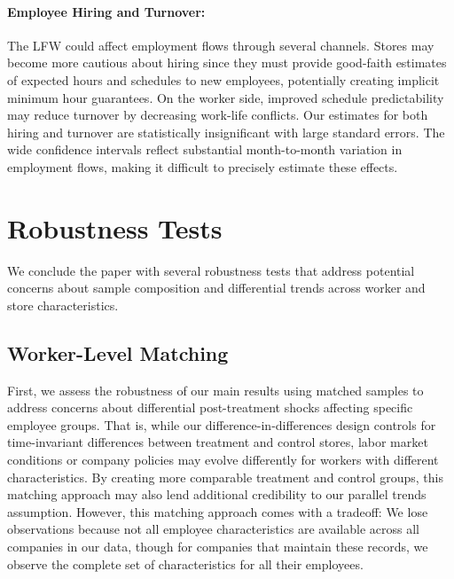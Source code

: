 \documentclass[letterpaper,11pt,leqno]{article}
\theoremstyle{paper}
\begin{document}
\paragraph{Employee Hiring and Turnover:} The LFW could affect employment flows through several channels. Stores may become more cautious about hiring since they must provide good-faith estimates of expected hours and schedules to new employees, potentially creating implicit minimum hour guarantees. On the worker side, improved schedule predictability may reduce turnover by decreasing work-life conflicts. Our estimates for both hiring and turnover are statistically insignificant with large standard errors. The wide confidence intervals reflect substantial month-to-month variation in employment flows, making it difficult to precisely estimate these effects. 




\section{Robustness Tests} \label{sec:robustness_tests}

We conclude the paper with several robustness tests that address potential concerns about sample composition and differential trends across worker and store characteristics.

\subsection{Worker-Level Matching}

First, we assess the robustness of our main results using matched samples to address concerns about differential post-treatment shocks affecting specific employee groups. That is, while our difference-in-differences design controls for time-invariant differences between treatment and control stores, labor market conditions or company policies may evolve differently for workers with different characteristics. By creating more comparable treatment and control groups, this matching approach may also lend additional credibility to our parallel trends assumption.   However, this matching approach comes with a tradeoff: We lose observations because not all employee characteristics are available across all companies in our data, though for companies that maintain these records, we observe the complete set of characteristics for all their employees.
\end{document}
